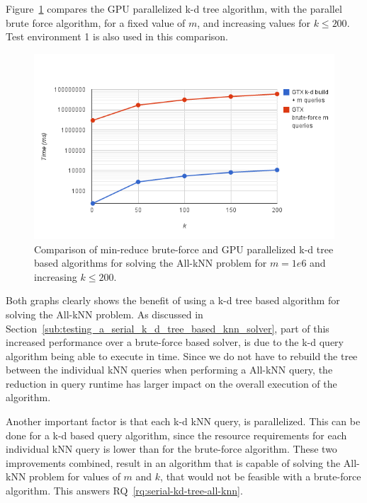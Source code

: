 Figure~\ref{fig:final-var-all-knn-kd-vs-bf} compares the GPU parallelized k-d tree algorithm, with the parallel brute force algorithm, for a fixed value of $m$, and increasing values for $k\le200$. Test environment 1 is also used in this comparison.

\begin{figure}[ht!]
    \centering
    \includegraphics[width=120mm]{../gfx/final-var-all-knn-kd-vs-bf.png}
    \caption{Comparison of min-reduce brute-force and GPU parallelized k-d tree based algorithms for solving the All-kNN problem for $m=1e6$ and increasing $k\le200$.}
    \label{fig:final-var-all-knn-kd-vs-bf}
\end{figure}

Both graphs clearly shows the benefit of using a k-d tree based algorithm for solving the All-kNN problem. As discussed in Section~\ref{sub:testing_a_serial_k_d_tree_based_knn_solver}, part of this increased performance over a brute-force based solver, is due to the k-d query algorithm being able to execute in  time. Since we do not have to rebuild the tree between the individual kNN queries when performing a All-kNN query, the reduction in query runtime has larger impact on the overall execution of the algorithm.

Another important factor is that each k-d kNN query, is parallelized. This can be done for a k-d based query algorithm, since the resource requirements for each individual kNN query is lower than for the brute-force algorithm. These two improvements combined, result in an algorithm that is capable of solving the All-kNN problem for values of $m$ and $k$, that would not be feasible with a brute-force algorithm. This answers RQ~\ref{rq:serial-kd-tree-all-knn}.

